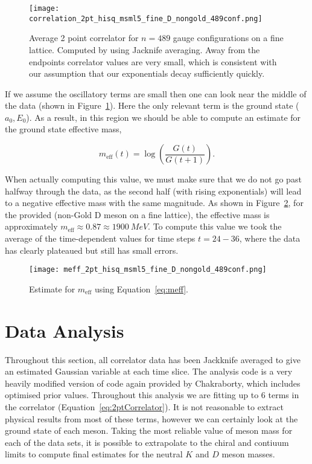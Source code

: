 \documentclass[a4paper,12pt]{article}
\begin{document}
\begin{figure}[!h]
    \centering
    \texttt{[image: correlation\_2pt\_hisq\_msml5\_fine\_D\_nongold\_489conf.png]}
    \caption{Average 2 point correlator for $n=489$ gauge configurations on a fine lattice. Computed by using Jacknife averaging. Away from the endpoints correlator values are very small, which is consistent with our assumption that our exponentials decay sufficiently quickly.\label{fig:2ptCorrelator}}
\end{figure}

If we assume the oscillatory terms are small then one can look near the middle of the data (shown in Figure~\ref{fig:2ptCorrelator}). Here the only relevant term is the ground state ($a_0, E_0$). As a result, in this region we should be able to compute an estimate for the ground state effective mass, 

\begin{equation}
    \label{eq:meff}
    m_{\mathrm{eff}}(t) = \log(\frac{G(t)}{G(t+1)}).
\end{equation}

When actually computing this value, we must make sure that we do not go past halfway through the data, as the second half (with rising exponentials) will lead to a negative effective mass with the same magnitude. As shown in Figure~\ref{fig:2ptCorrelatorMeff}, for the provided (non-Gold D meson on a fine lattice), the effective mass is approximately $m_\text{eff} \approx 0.87 \approx \SI{1900}{MeV}$. To compute this value we took the average of the time-dependent values for time steps $t = 24 - 36$, where the data has clearly plateaued but still has small errors.

\begin{figure}[!h]
    \centering
    \texttt{[image: meff\_2pt\_hisq\_msml5\_fine\_D\_nongold\_489conf.png]}
    \caption{Estimate for $m_\text{eff}$ using Equation~\ref{eq:meff}.\label{fig:2ptCorrelatorMeff}} 
\end{figure}

\clearpage
\section{Data Analysis}
Throughout this section, all correlator data has been Jackknife averaged to give an estimated Gaussian variable at each time slice. The analysis code is a very heavily modified version of code again provided by Chakraborty, which includes optimised prior values. Throughout this analysis we are fitting up to 6 terms in the correlator (Equation~\ref{eq:2ptCorrelator}). It is not reasonable to extract physical results from most of these terms, however we can certainly look at the ground state of each meson. Taking the most reliable value of meson mass for each of the data sets, it is possible to extrapolate to the chiral and contiuum limits to compute final estimates for the neutral $K$ and $D$ meson masses.
\end{document}
